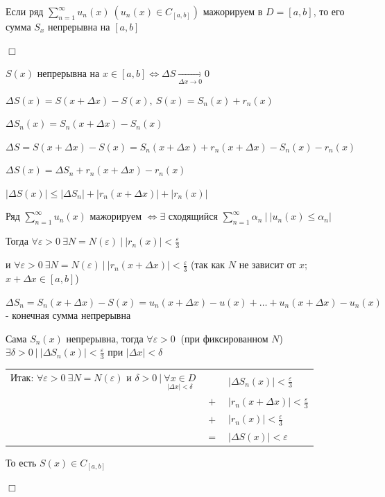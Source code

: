 \documentclass[12pt]{article}
\begin{document}
    \begin{MyTheorem}
        \Ths Если ряд $\sum_{n = 1}^\infty u_n(x) \ (u_n(x) \in C_{[a, b]})$ мажорируем в $D = [a, b]$, то 
        его сумма $S_x$ непрерывна на $[a, b]$
    \end{MyTheorem}

    \begin{MyProof}
        $\Box$

        $S(x)$ непрерывна на $x \in [a, b] \Longleftrightarrow \Delta S \underset{\Delta x \to 0}{\rightarrow} 0$

        $\Delta S(x) = S(x + \Delta x) - S(x), \ S(x) = S_n(x) + r_n(x)$

        $\Delta S_n(x) = S_n(x + \Delta x) - S_n(x)$

        $\Delta S = S(x + \Delta x) - S(x) = S_n(x + \Delta x) + r_n(x +  \Delta x) - S_n(x) - r_n(x)$

        $\Delta S(x) = \Delta S_n + r_n(x + \Delta x) - r_n(x)$

        $|\Delta S(x)| \leq |\Delta S_n| + |r_n(x + \Delta x)| + |r_n(x)|$

        Ряд $\sum_{n = 1}^\infty u_n(x)$ мажорируем $\Longleftrightarrow \exists$ сходящийся $\sum_{n = 1}^\infty \alpha_n \ \Big| \ |u_n(x) \leq \alpha_n|$
    
        Тогда $\forall \varepsilon > 0 \ \exists N = N(\varepsilon) \ | \ |r_n(x)| < \frac{\varepsilon}{3}$

        и $\forall \varepsilon > 0 \ \exists N = N(\varepsilon) \ | \ |r_n(x + \Delta x)| < \frac{\varepsilon}{3}$ (так как $N$ не зависит от $x$; $x + \Delta x \in [a, b]$) 
    
        $\Delta S_n = S_n(x + \Delta x) - S(x) = u_n(x + \Delta x) - u(x) + \dots + u_n(x + \Delta x) - u_n(x)$ - конечная сумма непрерывна

        Сама $S_n(x)$ непрерывна, тогда $\forall \varepsilon > 0 \ $ (при фиксированном $N$) $\exists \delta > 0 \ | \ |\Delta S_n(x)| < \frac{\varepsilon}{3}$ при $|\Delta x| < \delta$

        \bgroup
        \setlength\tabcolsep{1.5pt}
        \begin{tabular}{ccl}
            Итак: $\forall \varepsilon > 0 \ \exists N = N(\varepsilon)$ и $\delta > 0 \ | \ \underset{|\Delta x| < \delta}{\forall x \in D}$ & & $|\Delta S_n(x)| < \frac{\varepsilon}{3}$ \\
            
            & $+$ & $|r_n(x + \Delta x)| < \frac{\varepsilon}{3}$ \\ 
            
            & $+$ & $|r_n(x)| < \frac{\varepsilon}{3}$ \\

            & $=$ & $|\Delta S(x)| < \varepsilon$
        \end{tabular}
        \egroup

        То есть $S(x) \in C_{[a, b]}$

        $\Box$
    \end{MyProof}
\end{document}
